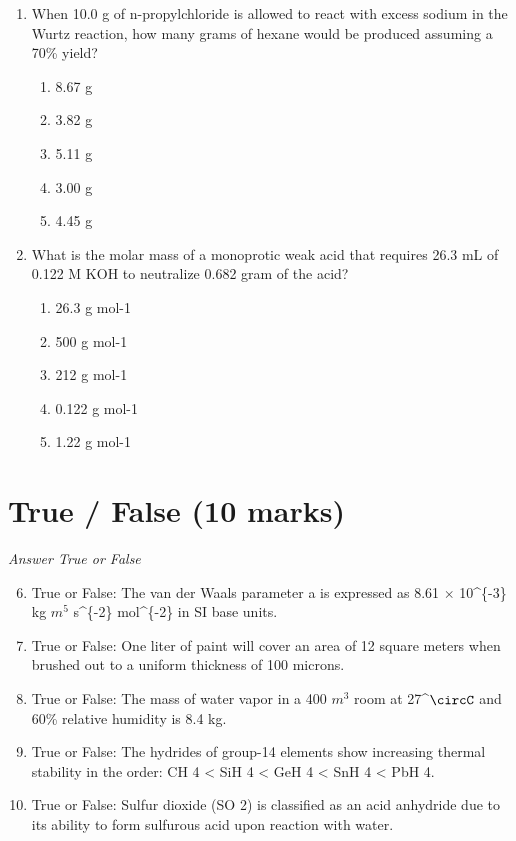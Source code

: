\documentclass[12pt]{article}
\begin{document}
\begin{enumerate}[label=\arabic*.]
\begin{enumerate}[label=(\alph*)]
\end{enumerate}
\item When 10.0 g of n-propylchloride is allowed to react with excess sodium in the Wurtz reaction, how many grams of hexane would be produced assuming a 70\% yield?
\begin{enumerate}[label=(\alph*)]
    \item 8.67 g
    \item 3.82 g
    \item 5.11 g
    \item 3.00 g
    \item 4.45 g
\end{enumerate}
\item What is the molar mass of a monoprotic weak acid that requires 26.3 mL of 0.122 M KOH to neutralize 0.682 gram of the acid?
\begin{enumerate}[label=(\alph*)]
    \item 26.3 g mol-1
    \item 500 g mol-1
    \item 212 g mol-1
    \item 0.122 g mol-1
    \item 1.22 g mol-1
\end{enumerate}
\end{enumerate}

\section*{True / False (10 marks)}
\textit{Answer True or False}
\begin{enumerate}[label=\arabic*.]
\setcounter{enumi}{5}
\item True or False: The van der Waals parameter a is expressed as 8.61 \ensuremath{\times} 10^\{-3\} kg $m^5$ s^\{-2\} mol^\{-2\} in SI base units.
\item True or False: One liter of paint will cover an area of 12 square meters when brushed out to a uniform thickness of 100 microns.
\item True or False: The mass of water vapor in a 400 $m^3$ room at 27^\ensuremath{\circC} and 60\% relative humidity is 8.4 kg.
\item True or False: The hydrides of group-14 elements show increasing thermal stability in the order: CH 4 \textless{} SiH 4 \textless{} GeH 4 \textless{} SnH 4 \textless{} PbH 4.
\item True or False: Sulfur dioxide (SO 2) is classified as an acid anhydride due to its ability to form sulfurous acid upon reaction with water.
\end{enumerate}
\end{document}
